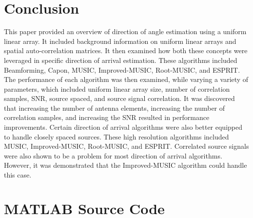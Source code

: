\documentclass[conference]{IEEEtran}
\begin{document}
	\section{Conclusion}
		
	This paper provided an overview of direction of angle estimation using a uniform linear array. It included background information on uniform linear arrays and spatial auto-correlation matrices. It then examined how both these concepts were leveraged in specific direction of arrival estimation. These algorithms included Beamforming, Capon, MUSIC, Improved-MUSIC, Root-MUSIC, and ESPRIT. The performance of each algorithm was then examined, while varying a variety of parameters, which included uniform linear array size, number of correlation samples, SNR, source spaced, and source signal correlation. It was discovered that increasing the number of antenna elements, increasing the number of correlation samples, and increasing the SNR resulted in performance improvements. Certain direction of arrival algorithms were also better equipped to handle closely spaced sources. These high resolution algorithms included MUSIC, Improved-MUSIC, Root-MUSIC, and ESPRIT. Correlated source signals were also shown to be a problem for most direction of arrival algorithms. However, it was demonstrated that the Improved-MUSIC algorithm could handle this case.
	 
	
	
	\onecolumn
	\pagebreak
	\appendices
	\section{MATLAB Source Code}
	\label{appendix::matlab_code}
	\lstset{style=Matlab-editor}
	
	
	
	
	
	
	
	
	
	
	
	
	
	
	
	\raggedbottom
\end{document}
